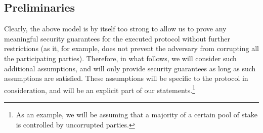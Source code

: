 \subsection{Preliminaries}


%

Clearly, the above model is by itself too strong to allow us to prove  any meaningful security
guarantees for the executed protocol without further restrictions (as it, for
example, does not prevent the adversary from corrupting all the participating
parties). Therefore, in what follows, we will consider such additional
assumptions, and will only
provide security guarantees as long as such assumptions are satisfied.
These assumptions will be specific to the protocol in consideration, and will be an
explicit part of our statements.\footnote{As an example, we will be assuming that a
majority of a certain pool of stake is controlled by uncorrupted parties.}


